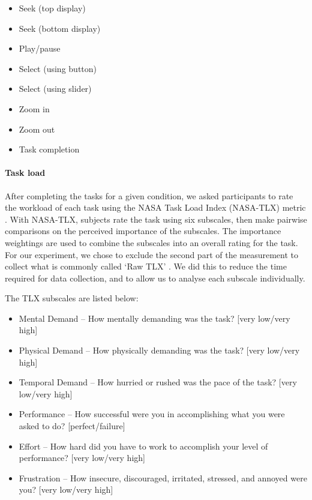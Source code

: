 {\singlespacing
\begin{itemize}
  \item Seek (top display)
  \item Seek (bottom display)
  \item Play/pause
  \item Select (using button)
  \item Select (using slider)
  \item Zoom in
  \item Zoom out
  \item Task completion
\end{itemize}
}

\paragraph{Task load}
After completing the tasks for a given condition, we asked participants to rate the workload of each task using the
NASA Task Load Index (NASA-TLX) metric \citep{Hart1988}.  With NASA-TLX, subjects rate the task using six subscales,
then make pairwise comparisons on the perceived importance of the subscales. The importance weightings are used to
combine the subscales into an overall rating for the task. For our experiment, we chose to exclude the second part of
the measurement to collect what is commonly called `Raw TLX' \citep{Hart2006}. We did this to reduce the time required
for data collection, and to allow us to analyse each subscale individually.

The TLX subscales are listed below:

{\singlespacing
\begin{itemize}
  \item Mental Demand -- How mentally demanding was the task? [very low/very high]
  \item Physical Demand -- How physically demanding was the task? [very low/very high]
  \item Temporal Demand -- How hurried or rushed was the pace of the task?  [very low/very high]
  \item Performance -- How successful were you in accomplishing what you were asked to do? [perfect/failure]
  \item Effort -- How hard did you have to work to accomplish your level of performance? [very low/very high]
  \item Frustration -- How insecure, discouraged, irritated, stressed, and annoyed were you? [very low/very high]
\end{itemize}
}

